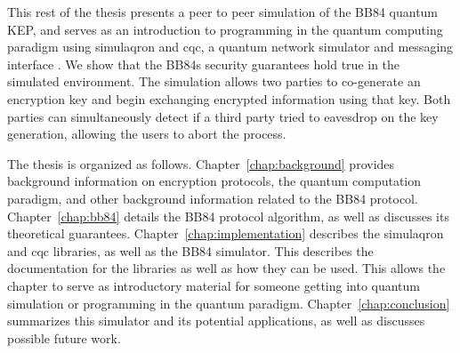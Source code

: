 This rest of the thesis presents a peer to peer simulation of the BB84 quantum KEP, and serves as an introduction to programming in the quantum computing paradigm using simulaqron and cqc, a quantum network simulator and messaging interface \cite{simulaqron}.
We show that the BB84s security guarantees hold true in the simulated environment.
The simulation allows two parties to co-generate an encryption key and begin exchanging encrypted information using that key.
Both parties can simultaneously detect if a third party tried to eavesdrop on the key generation, allowing the users to abort the process. 

The thesis is organized as follows.
Chapter~\ref{chap:background} provides background information on encryption protocols, the quantum computation paradigm, and other background information related to the BB84 protocol. 
Chapter~\ref{chap:bb84} details the BB84 protocol algorithm, as well as discusses its theoretical guarantees.
Chapter~\ref{chap:implementation} describes the simulaqron and cqc libraries, as well as the BB84 simulator.
This describes the documentation for the libraries as well as how they can be used.
This allows the chapter to serve as introductory material for someone getting into quantum simulation or programming in the quantum paradigm.
Chapter~\ref{chap:conclusion} summarizes this simulator and its potential applications, as well as discusses possible future work.

